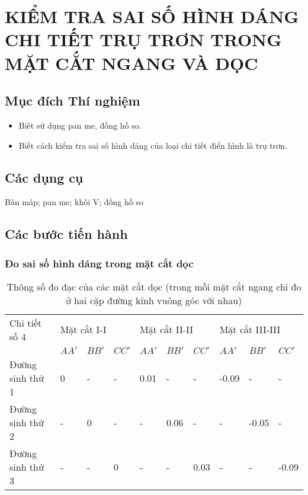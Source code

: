 \chapter{KIỂM TRA SAI SỐ HÌNH DÁNG CHI TIẾT TRỤ TRƠN TRONG MẶT CẮT NGANG VÀ DỌC}

\section{Mục đích Thí nghiệm}
\begin{itemize}
	\item Biêt sử dụng pan me, đồng hồ so.
	\item Biết cách kiểm tra sai số hình dáng của loại chi tiết điển hình là trụ trơn.
\end{itemize}

\section{Các dụng cụ}
Bàn máp; pan me; khối V; đồng hồ so

\section{Các bước tiến hành}
\subsection{Đo sai số hình dáng trong mặt cắt dọc}
\begin{table}[ht]
	\centering
	\caption{Thông số đo đạc của các mặt cắt dọc (trong mỗi mặt cắt ngang chỉ đo ở hai cặp đường kính vuông góc với nhau)}
	\begin{tabular}{llllllllll}\toprule
		Chi tiết số 4 & \multicolumn{3}{l}{Mặt cắt I-I} & \multicolumn{3}{l}{Mặt cắt II-II} & \multicolumn{3}{l}{Mặt cắt III-III}\\
		\cmidrule(r{4pt}){2-4} \cmidrule(r{4pt}){5-7} \cmidrule(r{4pt}){8-10}
		& $ AA' $ & $ BB' $ & $ CC' $ & $ AA' $ & $ BB' $ & $ CC' $ & $ AA' $ & $ BB' $ & $ CC' $\\\midrule
		Đường sinh thứ 1 & 0 & - & - & 0.01 & - & - & -0.09 & - & -\\
		Đường sinh thứ 2 & - & 0 & - & - & 0.06 & - & - & -0.05 & -\\
		Đường sinh thứ 3 & - & - & 0 & - & - & 0.03 & - & - & -0.09\\\bottomrule
	\end{tabular}
\end{table}
